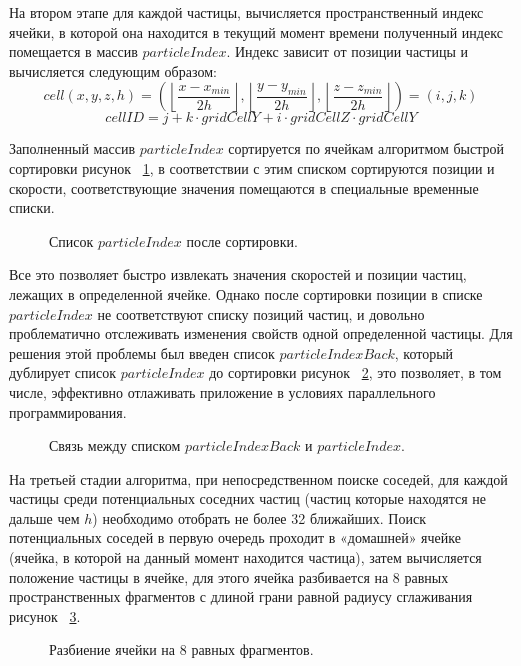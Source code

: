 На втором этапе для каждой частицы, вычисляется пространственный индекс ячейки, в которой она находится в текущий момент времени \cite {Teschner2003} полученный индекс помещается в массив \(particleIndex\).  Индекс зависит от позиции частицы и вычисляется следующим образом:
\[
cell(x,y,z,h) = \left( \left \lfloor \frac{x - x_{min}}{2h} \right \rfloor, \left \lfloor \frac{y - y_{min}}{2h} \right \rfloor, \left \lfloor \frac{z - z_{min}}{2h} \right \rfloor \right ) = (i,j,k)
\]
\[
cellID = j + k \cdot gridCellY + i \cdot gridCellZ \cdot gridCellY
\]

Заполненный массив \(particleIndex\) сортируется по ячейкам алгоритмом быстрой сортировки рисунок ~\ref{fig:ns_2}, в соответствии с этим списком сортируются позиции и скорости, соответствующие значения помещаются в специальные временные списки. 
\begin{figure}[ht]
  \centerfloat{
    \texttt{[image: ns\_2]}
  }
  \caption{Список \(particleIndex\) после сортировки.}
  \label{fig:ns_2}
\end{figure}

Все это позволяет быстро извлекать значения скоростей и позиции частиц, лежащих в определенной ячейке. Однако после сортировки позиции в списке \(particleIndex\) не соответствуют списку позиций частиц, и довольно проблематично отслеживать изменения свойств одной определенной частицы. Для решения этой проблемы был введен список \(particleIndexBack\), который дублирует список \(particleIndex\) до сортировки рисунок ~\ref{fig:ns_3}, это позволяет, в том числе, эффективно отлаживать приложение в условиях параллельного программирования.
\begin{figure}[ht]
  \centerfloat{
    \texttt{[image: ns\_3]}
  }
  \caption{Связь между списком \(particleIndexBack\) и \(particleIndex\).}
  \label{fig:ns_3}
\end{figure}

На третьей стадии алгоритма, при непосредственном поиске соседей, для каждой частицы среди потенциальных соседних частиц (частиц которые находятся не дальше чем \(h\)) необходимо отобрать не более 32 ближайших. Поиск потенциальных соседей в первую очередь проходит в «домашней» ячейке (ячейка, в которой на данный момент находится частица), затем вычисляется положение частицы в ячейке, для этого ячейка разбивается на 8 равных пространственных фрагментов с длиной грани равной радиусу сглаживания рисунок ~\ref{fig:ns_4}.
\begin{figure}[ht]
  \centerfloat{
    \texttt{[image: ns\_4]}
  }
  \caption{Разбиение ячейки на 8 равных фрагментов.}
  \label{fig:ns_4}
\end{figure}

